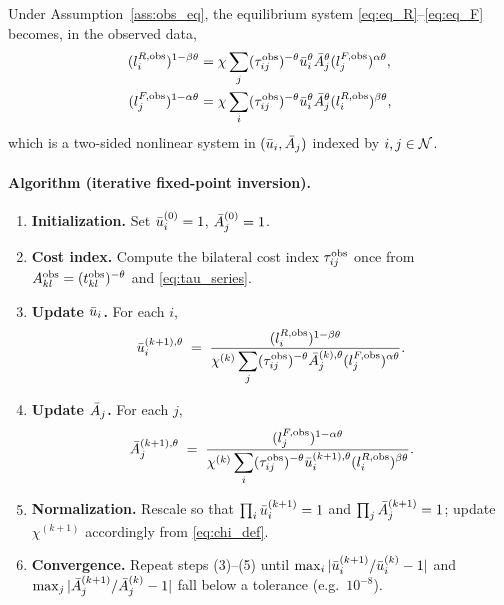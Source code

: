 Under Assumption~\ref{ass:obs_eq}, the equilibrium system
\eqref{eq:eq_R}--\eqref{eq:eq_F} becomes, in the observed data,
\begin{align}
  (l_i^{R,\mathrm{obs}})^{1-\beta\theta}
  &=\chi\sum_{j}(\tau_{ij}^{\mathrm{obs}})^{-\theta}\bar u_i^{\theta}\bar A_j^{\theta}
       (l_j^{F,\mathrm{obs}})^{\alpha\theta},
  \label{eq:invert_R}\\
  (l_j^{F,\mathrm{obs}})^{1-\alpha\theta}
  &=\chi\sum_{i}(\tau_{ij}^{\mathrm{obs}})^{-\theta}\bar u_i^{\theta}\bar A_j^{\theta}
       (l_i^{R,\mathrm{obs}})^{\beta\theta},
  \label{eq:invert_F}
\end{align}
which is a two-sided nonlinear system in $(\bar u_i,\bar A_j)$ indexed
by $i,j\in\mathcal N$.

\paragraph{Algorithm (iterative fixed-point inversion).}

\begin{enumerate}[leftmargin=2em,itemsep=0.25em]
\item \textbf{Initialization.} Set $\bar u_i^{(0)}=1$, $\bar A_j^{(0)}=1$.
\item \textbf{Cost index.} Compute the bilateral cost index
      $\tau_{ij}^{\mathrm{obs}}$ once from
      $A^{\mathrm{obs}}_{kl}=(t_{kl}^{\mathrm{obs}})^{-\theta}$ and
      \eqref{eq:tau_series}.
\item \textbf{Update $\bar u_i$.} For each $i$,
\begin{equation}\label{eq:update_u}
  \bar u_i^{(k+1),\theta}
  \;=\;
  \frac{(l_i^{R,\mathrm{obs}})^{1-\beta\theta}}
       {\chi^{(k)}\displaystyle\sum_{j}(\tau_{ij}^{\mathrm{obs}})^{-\theta}
          \bar A_j^{(k),\theta}(l_j^{F,\mathrm{obs}})^{\alpha\theta}}.
\end{equation}
\item \textbf{Update $\bar A_j$.} For each $j$,
\begin{equation}\label{eq:update_A}
  \bar A_j^{(k+1),\theta}
  \;=\;
  \frac{(l_j^{F,\mathrm{obs}})^{1-\alpha\theta}}
       {\chi^{(k)}\displaystyle\sum_{i}(\tau_{ij}^{\mathrm{obs}})^{-\theta}
          \bar u_i^{(k+1),\theta}(l_i^{R,\mathrm{obs}})^{\beta\theta}}.
\end{equation}
\item \textbf{Normalization.} Rescale so that
      $\prod_i\bar u_i^{(k+1)}=1$ and $\prod_j\bar A_j^{(k+1)}=1$;
      update $\chi^{(k+1)}$ accordingly from
      \eqref{eq:chi_def}.
\item \textbf{Convergence.} Repeat steps (3)--(5) until
      $\max_i|\bar u_i^{(k+1)}/\bar u_i^{(k)}-1|$ and
      $\max_j|\bar A_j^{(k+1)}/\bar A_j^{(k)}-1|$ fall below a
      tolerance (e.g.\ $10^{-8}$).
\end{enumerate}

